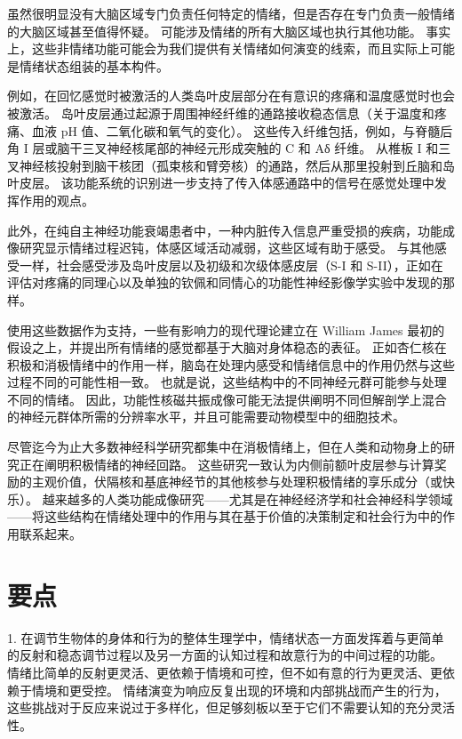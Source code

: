 虽然很明显没有大脑区域专门负责任何特定的情绪，但是否存在专门负责一般情绪的大脑区域甚至值得怀疑。
可能涉及情绪的所有大脑区域也执行其他功能。
事实上，这些非情绪功能可能会为我们提供有关情绪如何演变的线索，而且实际上可能是情绪状态组装的基本构件。


例如，在回忆感觉时被激活的人类岛叶皮层部分在有意识的疼痛和温度感觉时也会被激活。
岛叶皮层通过起源于周围神经纤维的通路接收稳态信息（关于温度和疼痛、血液 pH 值、二氧化碳和氧气的变化）。
这些传入纤维包括，例如，与脊髓后角 I 层或脑干三叉神经核尾部的神经元形成突触的 C 和 Aδ 纤维。
从椎板 I 和三叉神经核投射到脑干核团（孤束核和臂旁核）的通路，然后从那里投射到丘脑和岛叶皮层。
该功能系统的识别进一步支持了传入体感通路中的信号在感觉处理中发挥作用的观点。


此外，在纯自主神经功能衰竭患者中，一种内脏传入信息严重受损的疾病，功能成像研究显示情绪过程迟钝，体感区域活动减弱，这些区域有助于感受。
与其他感受一样，社会感受涉及岛叶皮层以及初级和次级体感皮层（S-I 和 S-II），正如在评估对疼痛的同理心以及单独的钦佩和同情心的功能性神经影像学实验中发现的那样。


使用这些数据作为支持，一些有影响力的现代理论建立在 William James 最初的假设之上，并提出所有情绪的感觉都基于大脑对身体稳态的表征。
正如杏仁核在积极和消极情绪中的作用一样，脑岛在处理内感受和情绪信息中的作用仍然与这些过程不同的可能性相一致。
也就是说，这些结构中的不同神经元群可能参与处理不同的情绪。
因此，功能性核磁共振成像可能无法提供阐明不同但解剖学上混合的神经元群体所需的分辨率水平，并且可能需要动物模型中的细胞技术。


尽管迄今为止大多数神经科学研究都集中在消极情绪上，但在人类和动物身上的研究正在阐明积极情绪的神经回路。
这些研究一致认为内侧前额叶皮层参与计算奖励的主观价值，伏隔核和基底神经节的其他核参与处理积极情绪的享乐成分（或快乐）。
越来越多的人类功能成像研究——尤其是在神经经济学和社会神经科学领域——将这些结构在情绪处理中的作用与其在基于价值的决策制定和社会行为中的作用联系起来。



\section{要点}

1. 在调节生物体的身体和行为的整体生理学中，情绪状态一方面发挥着与更简单的反射和稳态调节过程以及另一方面的认知过程和故意行为的中间过程的功能。
情绪比简单的反射更灵活、更依赖于情境和可控，但不如有意的行为更灵活、更依赖于情境和更受控。
情绪演变为响应反复出现的环境和内部挑战而产生的行为，这些挑战对于反应来说过于多样化，但足够刻板以至于它们不需要认知的充分灵活性。


